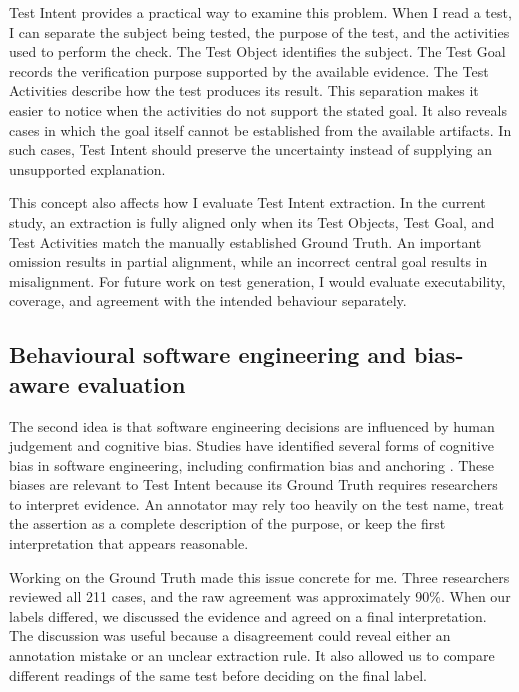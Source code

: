 Test Intent provides a practical way to examine this problem. When I read a test, I can separate the subject being tested, the purpose of the test, and the activities used to perform the check. The Test Object identifies the subject. The Test Goal records the verification purpose supported by the available evidence. The Test Activities describe how the test produces its result. This separation makes it easier to notice when the activities do not support the stated goal. It also reveals cases in which the goal itself cannot be established from the available artifacts. In such cases, Test Intent should preserve the uncertainty instead of supplying an unsupported explanation.

This concept also affects how I evaluate Test Intent extraction. In the current study, an extraction is fully aligned only when its Test Objects, Test Goal, and Test Activities match the manually established Ground Truth. An important omission results in partial alignment, while an incorrect central goal results in misalignment. For future work on test generation, I would evaluate executability, coverage, and agreement with the intended behaviour separately. 

\subsection{Behavioural software engineering and bias-aware evaluation}

The second idea is that software engineering decisions are influenced by human judgement and cognitive bias. Studies have identified several forms of cognitive bias in software engineering, including confirmation bias and anchoring \cite{DBLP:journals/tse/MohananiSTRR20}. These biases are relevant to Test Intent because its Ground Truth requires researchers to interpret evidence. An annotator may rely too heavily on the test name, treat the assertion as a complete description of the purpose, or keep the first interpretation that appears reasonable.


Working on the Ground Truth made this issue concrete for me. Three researchers reviewed all 211 cases, and the raw agreement was approximately 90\%. When our labels differed, we discussed the evidence and agreed on a final interpretation. The discussion was useful because a disagreement could reveal either an annotation mistake or an unclear extraction rule. It also allowed us to compare different readings of the same test before deciding on the final label.

